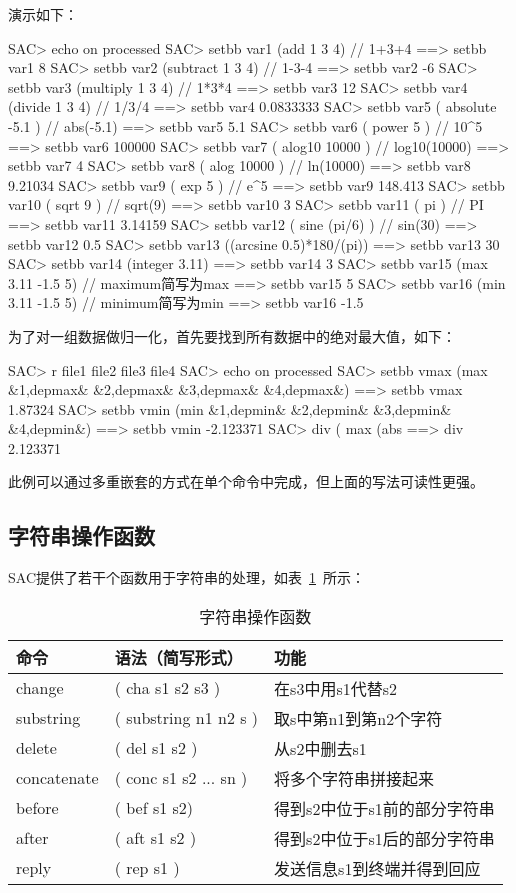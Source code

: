 演示如下：
\begin{SACCode}
SAC> echo on processed
SAC> setbb var1 (add 1 3 4)         // 1+3+4
 ==>  setbb var1 8
SAC> setbb var2 (subtract 1 3 4)    // 1-3-4
 ==>  setbb var2 -6
SAC> setbb var3 (multiply 1 3 4)    // 1*3*4
 ==>  setbb var3 12
SAC> setbb var4 (divide 1 3 4)      // 1/3/4
 ==>  setbb var4 0.0833333
SAC> setbb var5 ( absolute -5.1 )   // abs(-5.1)
 ==>  setbb var5 5.1
SAC> setbb var6 ( power 5 )         // 10^5
 ==>  setbb var6 100000
SAC> setbb var7 ( alog10 10000 )    // log10(10000)
 ==>  setbb var7 4
SAC> setbb var8 ( alog 10000 )      // ln(10000)
 ==>  setbb var8 9.21034
SAC> setbb var9 ( exp 5 )           // e^5
 ==>  setbb var9 148.413
SAC> setbb var10 ( sqrt 9 )         // sqrt(9)
 ==>  setbb var10 3
SAC> setbb var11 ( pi )             // PI
 ==>  setbb var11 3.14159
 SAC> setbb var12 ( sine (pi/6) )   // sin(30)
 ==>  setbb var12 0.5
SAC> setbb var13 ((arcsine 0.5)*180/(pi))
 ==>  setbb var13 30
SAC> setbb var14 (integer 3.11)
 ==>  setbb var14 3
SAC> setbb var15 (max 3.11 -1.5 5)  // maximum简写为max
 ==>  setbb var15 5
SAC> setbb var16 (min 3.11 -1.5 5)  // minimum简写为min
 ==>  setbb var16 -1.5
\end{SACCode}

为了对一组数据做归一化，首先要找到所有数据中的绝对最大值，如下：
\begin{SACCode}
SAC> r file1 file2 file3 file4
SAC> echo on processed
SAC> setbb vmax (max &1,depmax& &2,depmax& &3,depmax& &4,depmax&)
 ==> setbb vmax 1.87324
SAC> setbb vmin (min &1,depmin& &2,depmin& &3,depmin& &4,depmin&)
 ==> setbb vmin -2.123371
SAC> div ( max (abs %
 ==>  div 2.123371
\end{SACCode}
此例可以通过多重嵌套的方式在单个命令中完成，但上面的写法可读性更强。

\subsection{字符串操作函数}
SAC提供了若干个函数用于字符串的处理，如表~\ref{table:string-operation-functions}~所示：

\begin{table}[!ht]
\centering
\ttfamily
\small
\caption{字符串操作函数}
\label{table:string-operation-functions}
\begin{tabular}{lll}
	\toprule
	命令	&	语法（简写形式）	&	功能	\\
	\midrule
	change		&	( cha s1 s2 s3 ) 	&	在s3中用s1代替s2	\\
	substring 	&	( substring n1 n2 s ) 	&	取s中第n1到第n2个字符\\
	delete		&	( del s1 s2 )		&	从s2中删去s1	\\
	concatenate &	( conc s1 s2 ... sn )	&	将多个字符串拼接起来 \\
	before		&	( bef s1 s2)			&	得到s2中位于s1前的部分字符串\\
	after		&	( aft s1 s2 )			&	得到s2中位于s1后的部分字符串\\
	reply		&	( rep s1 )			&	发送信息s1到终端并得到回应	\\
	\bottomrule
\end{tabular}
\end{table}

